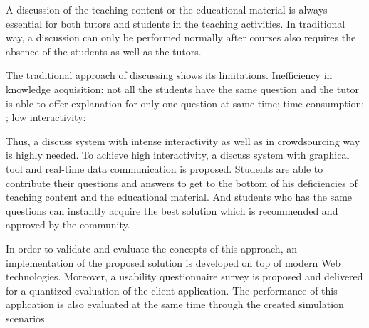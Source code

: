A discussion of the teaching content or the educational material is always essential for both tutors and students in the teaching activities. In traditional way, a discussion can only be performed normally after courses also requires the absence of the students as well as the tutors.

The traditional approach of discussing shows its limitations. Inefficiency in knowledge acquisition: not all the students have the same question and the tutor is able to offer explanation for only one question at same time; time-consumption: ; low interactivity:

Thus, a discuss system with intense interactivity as well as in crowdsourcing way is highly needed. To achieve high interactivity, a discuss system with graphical tool and real-time data communication is proposed. Students are able to contribute their questions and answers to get to the bottom of his deficiencies of teaching content and the educational material. And students who has the same questions can instantly acquire the best solution  which is recommended and approved by the community.

In order to validate and evaluate the concepts of this approach, an implementation of the proposed solution is developed on top of modern Web technologies. Moreover, a usability questionnaire survey is proposed and delivered for a quantized evaluation of the client application. The performance of this application is also evaluated at the same time through the created simulation scenarios.

